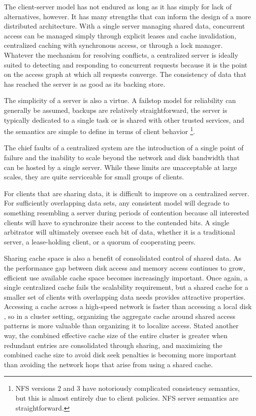 The client-server model has not endured as long as it has simply for lack of alternatives, however. It has many strengths that can inform the design of a more distributed architecture. With a single server managing shared data, concurrent access can be managed simply through explicit leases and cache invalidation, centralized caching with synchronous access, or through a lock manager. Whatever the mechanism for resolving conflicts, a centralized server is ideally suited to detecting and responding to concurrent requests because it is the point on the access graph at which all requests converge. The consistency of data that has reached the server is as good as its backing store.

The simplicity of a server is also a virtue. A failstop model for reliability can generally be assumed, backups are relatively straightforward, the server is typically dedicated to a single task or is shared with other trusted services, and the semantics are simple to define in terms of client behavior%
\footnote{NFS versions 2 and 3 have notoriously complicated consistency semantics, but this is almost entirely due to client policies. NFS server semantics are straightforward.}.

The chief faults of a centralized system are the introduction of a single point of failure and the inability to scale beyond the network and disk bandwidth that can be hosted by a single server. While these limits are unacceptable at large scales, they are quite serviceable for small groups of clients.

For clients that are sharing data, it is difficult to improve on a centralized server. For sufficiently overlapping data sets, any consistent model will degrade to something resembling a server during periods of contention because all interested clients will have to synchronize their access to the contended bits. A single arbitrator will ultimately oversee each bit of data, whether it is a traditional server, a lease-holding client, or a quorum of cooperating peers.

Sharing cache space is also a benefit of consolidated control of shared data. As the performance gap between disk access and memory access continues to grow, efficient use available cache space becomes increasingly important. Once again, a single centralized cache fails the scalability requirement, but a shared cache for a smaller set of clients with overlapping data needs provides attractive properties. Accessing a cache across a high-speed network is faster than accessing a local disk \cite{dahlin94b}, so in a cluster setting, organizing the aggregate cache around shared access patterns is more valuable than organizing it to localize access. Stated another way, the combined effective cache size of the entire cluster is greater when redundant entries are consolidated through sharing, and maximizing the combined cache size to avoid disk seek penalties is becoming more important than avoiding the network hops that arise from using a shared cache.

